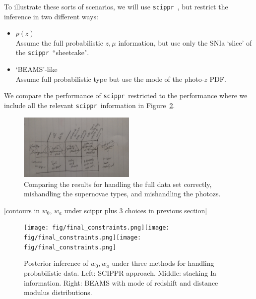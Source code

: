 \documentclass[12pt, twocolumn]{emulateapj}
\newcommand{\scippr}{\texttt{scippr}~}
\begin{document}
To illustrate these sorts of scenarios, we will use \scippr, but restrict the inference in two different ways:

\begin{itemize}
    \item $p(z)$ \\
    Assume the full probabilistic $z, \mu$ information, but use only the SNIa `slice' of the \scippr ``sheetcake".
    \item `BEAMS'-like \\   
    Assume full probabilistic type but use the mode of the photo-$z$ PDF.
\end{itemize}

We compare the performance of \scippr restricted to the performance where we include all the relevant \scippr information in Figure~\ref{fig:scippr_final2}.



\begin{figure}
	\begin{center}
	\includegraphics[width=0.5\textwidth]{fig/results2.png}
	\caption{Comparing the results for handling the full data set correctly, mishandling the supernovae types, and mishandling the photozs.}
	\label{fig:results2}
	\end{center}
\end{figure}

[contours in $w_0$, $w_a$ under scippr plus 3 choices in previous section]

\begin{figure}
	\begin{center}
		\texttt{[image: fig/final\_constraints.png]}\texttt{[image: fig/final\_constraints.png]}\texttt{[image: fig/final\_constraints.png]}
		\caption{Posterior inference of $w_{0}, w_{a}$ under three methods for handling probabilistic data.  
		Left: SCIPPR approach.  Middle: stacking Ia information.  
		Right: BEAMS with mode of redshift and distance modulus distributions.}
		\label{fig:scippr_final2}
	\end{center}
\end{figure}
\end{document}
